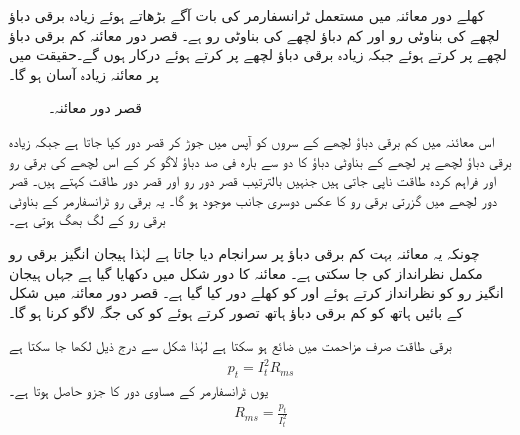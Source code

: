 کھلے دور معائنہ میں مستعمل  ٹرانسفارمر کی بات آگے بڑھاتے ہوئے زیادہ برقی دباؤ لچھے کی  بناوٹی رو  اور کم  دباؤ  لچھے کی  بناوٹی رو  ہے۔ قصر دور معائنہ کم برقی دباؤ لچھے پر کرتے ہوئے   جبکہ زیادہ برقی دباؤ لچھے پر  کرتے ہوئے   درکار ہوں گے۔حقیقت میں  پر معائنہ زیادہ آسان ہو گا۔
\begin{figure}
\centering
\caption{قصر دور معائنہ۔}
\label{شکل_ٹرانسفارمر_کسر_دور_معائنہ}
\end{figure}

اس معائنہ میں کم برقی دباؤ لچھے کے  سروں کو آپس میں جوڑ کر قصر دور کیا جاتا ہے  جبکہ زیادہ برقی دباؤ لچھے پر لچھے کے بناوٹی دباؤ کا دو سے بارہ  فی صد دباؤ   لاگو کر کے اس لچھے کی برقی رو  اور فراہم کردہ طاقت  ناپی  جاتی ہیں جنہیں بالترتیب قصر دور رو اور قصر دور طاقت کہتے ہیں۔ قصر دور لچھے میں  گزرتی  برقی رو  کا عکس دوسری جانب  موجود ہو گا۔ یہ برقی رو ٹرانسفارمر کے بناوٹی برقی رو کے لگ بھگ ہوتی ہے۔

 چونکہ یہ معائنہ بہت کم برقی دباؤ پر سرانجام دیا  جاتا ہے لہٰذا  ہیجان انگیز برقی رو  مکمل نظرانداز کی جا سکتی ہے۔ معائنہ کا دور شکل  میں دکھایا گیا ہے جہاں ہیجان انگیز رو کو نظرانداز کرتے ہوئے  اور  کو کھلے دور کیا گیا ہے۔  قصر دور معائنہ میں  شکل  کے بائیں ہاتھ کو کم برقی دباؤ  ہاتھ تصور کرتے ہوئے   کو   کی جگہ لاگو کرنا ہو گا۔

برقی طاقت صرف مزاحمت میں  ضائع ہو سکتا ہے لہٰذا  شکل  سے درج ذیل لکھا جا سکتا ہے
\begin{align*}
p_t=I_t^2 R_{ms}
\end{align*}
یوں ٹرانسفارمر کے مساوی دور کا جزو  حاصل ہوتا ہے۔
\begin{align}\label{مساوات_ٹرانسفارمر_کسر_دور_مزاحمت_حاصل}
R_{ms}=\frac{p_t}{I_t^2}
\end{align}

